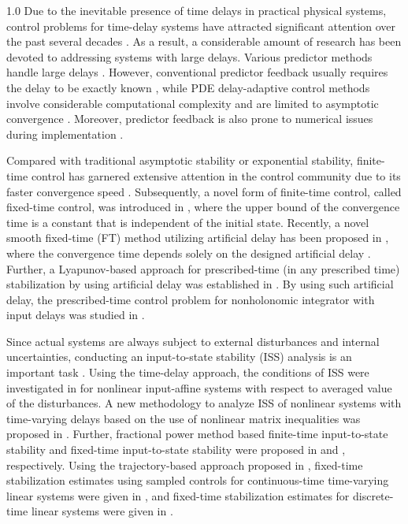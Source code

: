 \documentclass[journal]{IEEEtran}
\begin{document}
\begin{spacing}{1.0}
Due to the inevitable presence of time delays in practical physical systems, control problems for time-delay systems have attracted significant attention over the past several decades \cite{emilia14book,Gu03book,Michels07book,zhou12auto}. As a result, a considerable amount of research has been devoted to addressing systems with large delays. Various predictor methods handle large delays \cite{Krstic09book,emilia25survey}. However, conventional predictor feedback usually requires the delay to be exactly known \cite{Art03tac,Krstic10tac}, while PDE delay-adaptive control methods involve considerable computational complexity and are limited to asymptotic convergence \cite{Zhu16tac}. Moreover, predictor feedback is also prone to numerical issues during implementation \cite{Furtat17tac,kara17book,Mondi04tac}.

Compared with traditional asymptotic stability or exponential stability,
finite-time control has garnered extensive attention in the control community
due to its faster convergence speed \cite{Bhat00siam}. Subsequently, a novel form of
finite-time control, called fixed-time control, was introduced in
\cite{Polyakov11tac}, where the upper bound of the convergence time is a
constant that is independent of the initial state.
Recently, a novel smooth fixed-time (FT) method utilizing artificial delay has been
proposed in \cite{Zhou21tac}, where the convergence time depends solely on the
designed artificial delay \cite{Kara06siam,Michiels20scl}. Further, a
Lyapunov-based approach for prescribed-time (in any prescribed time) stabilization by using
artificial delay was established in \cite{Ding23tac}. By using such artificial
delay, the prescribed-time control problem for nonholonomic integrator with
input delays was studied in \cite{Ding26auto}.

Since actual systems are always subject to external disturbances and internal
uncertainties, conducting an input-to-state stability (ISS) analysis is an
important task \cite{Stang95ijc}. Using the time-delay approach, the
conditions of ISS were investigated in \cite{Efimov23tac} for nonlinear
input-affine systems with respect to averaged value of the disturbances. A
new methodology to analyze ISS of nonlinear systems with time-varying delays
based on the use of nonlinear matrix inequalities was proposed in
\cite{emilia08auto}. Further, fractional power method based finite-time
input-to-state stability and fixed-time input-to-state stability were proposed
in \cite{hong10siam} and \cite{Efimov24siam}, respectively. Using the
trajectory-based approach proposed in \cite{Mazen14tac}, fixed-time
stabilization estimates using sampled controls for continuous-time
time-varying linear systems were given in \cite{Mazenc25tac}, and fixed-time
stabilization estimates for discrete-time linear systems were
given in \cite{Mazenc24css}.


\end{spacing}
\end{document}
